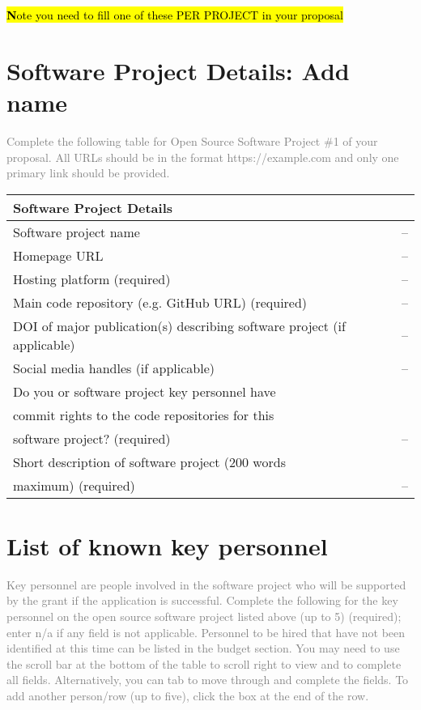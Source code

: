 \hl{\textbf Note you need to fill one of these PER PROJECT in your proposal}
\section{Software Project Details: Add name}
\textcolor{gray}{Complete the following table for Open Source Software Project \#1 of your proposal. All URLs should be in
the format https://example.com and only one primary link should be provided.}

\begin{table}[ht]
    \begin{tabular}{@{}ll@{}}
    \toprule
    Software Project Details &    \\ \midrule
    Software project name 
    & -- \\
    Homepage URL 
    & -- \\
    Hosting platform (required) 
    & -- \\
    Main code repository (e.g. GitHub URL) (required)                                      & -- \\
    DOI of major publication(s) describing software project (if applicable)
    & -- \\
    Social media handles (if applicable) 
    & -- \\
    Do you or software project key personnel have\\ commit rights to the code repositories for this\\ software project? (required) 
    & -- \\
    Short description of software project (200 words\\ maximum) (required)\
    & -- \\ \bottomrule
    \end{tabular}
\end{table}

\section{List of known key personnel}
\textcolor{gray}{Key personnel are people involved in the software project who will be supported by the grant if the
application is successful.
Complete the following for the key personnel on the open source software project listed above (up to 5)
(required); enter n/a if any field is not applicable. Personnel to be hired that have not been identified
at this time can be listed in the budget section. You may need to use the scroll bar at the bottom of the
table to scroll right to view and to complete all fields. Alternatively, you can tab to move through and
complete the fields. To add another person/row (up to five), click the box at the end of the row.}

